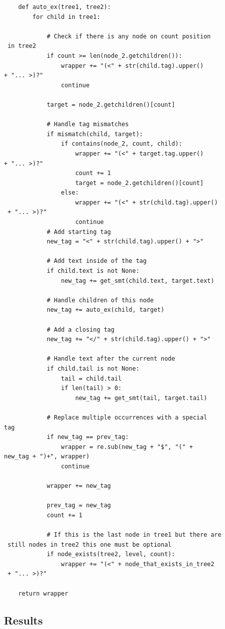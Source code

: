 \documentclass[9pt]{IEEEtran}
\begin{document}
\begin{verbatim}
	def auto_ex(tree1, tree2):
		for child in tree1:

	        # Check if there is any node on count position
 in tree2
	        if count >= len(node_2.getchildren()):
	            wrapper += "(<" + str(child.tag).upper() 
+ "... >)?"
	            continue

	        target = node_2.getchildren()[count]

	        # Handle tag mismatches
	        if mismatch(child, target):
	            if contains(node_2, count, child):
	                wrapper += "(<" + target.tag.upper() 
+ "... >)?"
	                count += 1
	                target = node_2.getchildren()[count]
	            else:
	                wrapper += "(<" + str(child.tag).upper()
 + "... >)?"
	                continue
	        # Add starting tag
	        new_tag = "<" + str(child.tag).upper() + ">"

	        # Add text inside of the tag
	        if child.text is not None:
	            new_tag += get_smt(child.text, target.text)

	        # Handle children of this node
	        new_tag += auto_ex(child, target)

	        # Add a closing tag
	        new_tag += "</" + str(child.tag).upper() + ">"

	        # Handle text after the current node
	        if child.tail is not None:
	            tail = child.tail
	            if len(tail) > 0:
	                new_tag += get_smt(tail, target.tail)

	        # Replace multiple occurrences with a special
tag
	        if new_tag == prev_tag:
	            wrapper = re.sub(new_tag + "$", "(" + 
new_tag + ")+", wrapper)
	            continue

	        wrapper += new_tag

	        prev_tag = new_tag
	        count += 1

	        # If this is the last node in tree1 but there are
 still nodes in tree2 this one must be optional
	        if node_exists(tree2, level, count):
	            wrapper += "(<" + node_that_exists_in_tree2
 + "... >)?"

    return wrapper
\end{verbatim}

\subsection{Results}
\end{document}
